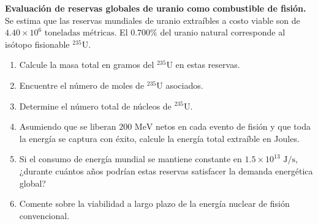 \item \textbf{Evaluación de reservas globales de uranio como combustible de fisión.}
Se estima que las reservas mundiales de uranio extraíbles a costo viable son de $4.40 \times 10^6\text{ toneladas métricas}$. El $0.700\%$ del uranio natural corresponde al isótopo fisionable $^{235}\text{U}$.
\begin{enumerate}
    \item Calcule la masa total en gramos del $^{235}\text{U}$ en estas reservas.
    \item Encuentre el número de moles de $^{235}\text{U}$ asociados.
    \item Determine el número total de núcleos de $^{235}\text{U}$.
    \item Asumiendo que se liberan $200\text{ MeV}$ netos en cada evento de fisión y que toda la energía se captura con éxito, calcule la energía total extraíble en Joules.
    \item Si el consumo de energía mundial se mantiene constante en $1.5 \times 10^{13}\text{ J/s}$, ¿durante cuántos años podrían estas reservas satisfacer la demanda energética global?
    \item Comente sobre la viabilidad a largo plazo de la energía nuclear de fisión convencional.
\end{enumerate}